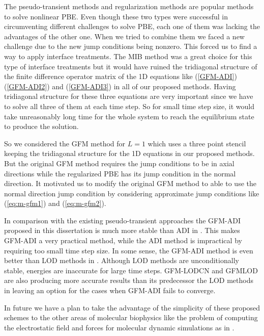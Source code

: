 The pseudo-transient methods and regularization methods are popular methods to solve nonlinear PBE. Even though these two types were successful in circumventing different challenges to solve PBE, each one of them was lacking the advantages of the other one. When we tried to combine them we faced a new challenge due to  the new jump conditions being nonzero. This forced us to find a way to apply interface treatments. The MIB method \cite{Geng2007,Chen2011,Yu2007,ZHAO2004,ZHOU2006,ZHOU2006_high,YU2007_3D} was a great choice for this type of interface treatments but it would have ruined the tridiagonal structure of the finite difference operator matrix of the 1D equations like (\ref{GFM-ADI}) (\ref{GFM-ADI2}) and (\ref{GFM-ADI3}) in all of our proposed methods. Having tridiagonal structure for these three equations are very important since we have to solve all three of them at each time step. So for small time step size, it would take unreasonably long time for the whole system to reach the equilibrium state to produce the solution.   

So we considered the GFM method \cite{Liu2000} for $L=1$ which uses a three point stencil keeping the tridiagonal structure for the 1D equations in our proposed methods. But the original GFM method requires the jump conditions to be in axial directions while the regularized PBE has its jump condition in the normal direction. It motivated us to modify the original GFM  method to able to use the normal direction jump condition by considering approximate jump conditions like (\ref{eq:m-gfm1}) and (\ref{eq:m-gfm2}). 

In comparison with the existing pseudo-transient approaches the GFM-ADI proposed in this dissertation is much more stable than ADI in \cite{Geng2013_Fully}. This makes GFM-ADI a very practical method, while the ADI method is impractical by requiring too small time step size. In some sense, the GFM-ADI method is even better than LOD methods in \cite{Wilson2016}. Although LOD methods are unconditionally stable, energies are inaccurate for large time steps. GFM-LODCN and GFMLOD are also producing more accurate results than its predecessor the LOD methods in \cite{Wilson2016} leaving an option for the cases when GFM-ADI fails to converge. 

In future we have a plan to take the advantage of the simplicity of these proposed schemes to the other areas of molecular biophysics like the problem of computing the electrostatic field and forces for molecular dynamic simulations as in \cite{GENG_WEI2011}. 
 